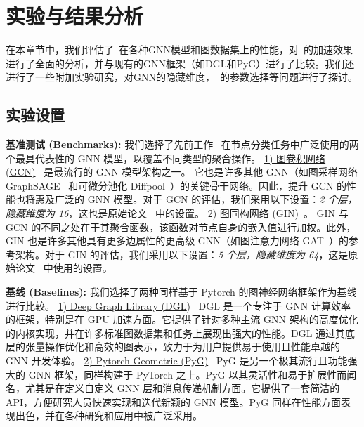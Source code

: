 \section{实验与结果分析}
在本章节中，我们评估了~\Mname{}在各种GNN模型和图数据集上的性能，对~\Mname{}的加速效果进行了全面的分析，并与现有的GNN框架（如DGL和PyG）进行了比较。我们还进行了一些附加实验研究，对GNN的隐藏维度，~\Mname{}的参数选择等问题进行了探讨。
\subsection{实验设置}
\hspace{5pt} \textbf{基准测试 (Benchmarks): }
我们选择了先前工作~\cite{wang2019dgl,pyG,ma2019neugraph} 在节点分类任务中广泛使用的两个最具代表性的 GNN 模型，以覆盖不同类型的聚合操作。
\underline{1) 图卷积网络 (GCN)}~\cite{GCNConv} 是最流行的 GNN 模型架构之一。
它也是许多其他 GNN（如图采样网络 GraphSAGE~\cite{SageConv} 和可微分池化 Diffpool~\cite{diffpool}）的关键骨干网络。因此，提升 GCN 的性能也将惠及广泛的 GNN 模型。对于 GCN 的评估，我们采用以下设置：\textit{2 个层，隐藏维度为 16}，这也是原始论文~\cite{GCNConv} 中的设置。
\underline{2) 图同构网络 (GIN)}~\cite{GINConv}。
GIN 与 GCN 的不同之处在于其聚合函数，该函数对节点自身的嵌入值进行加权。此外，GIN 也是许多其他具有更多边属性的更高级 GNN（如图注意力网络 GAT~\cite{GATConv}）的参考架构。对于 GIN 的评估，我们采用以下设置：\textit{5 个层，隐藏维度为 64}，这是原始论文~\cite{GINConv} 中使用的设置。

\textbf{基线 (Baselines): }
我们选择了两种同样基于 Pytorch 的图神经网络框架作为基线进行比较。
\underline{1) {Deep Graph Library (DGL})}~\cite{wang2019dgl} DGL 是一个专注于 GNN 计算效率的框架，特别是在 GPU 加速方面。它提供了针对多种主流 GNN 架构的高度优化的内核实现，并在许多标准图数据集和任务上展现出强大的性能。DGL 通过其底层的张量操作优化和高效的图表示，致力于为用户提供易于使用且性能卓越的 GNN 开发体验。
\underline{2) {Pytorch-Geometric (PyG})}~\cite{pyG} PyG 是另一个极其流行且功能强大的 GNN 框架，同样构建于 PyTorch 之上。PyG 以其灵活性和易于扩展性而闻名，尤其是在定义自定义 GNN 层和消息传递机制方面。它提供了一套简洁的 API，方便研究人员快速实现和迭代新颖的 GNN 模型。PyG 同样在性能方面表现出色，并在各种研究和应用中被广泛采用。

